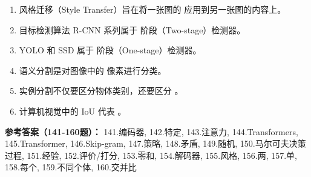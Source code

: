 \begin{enumerate}[resume,leftmargin=2em,itemsep=1pt]
\item 风格迁移（Style Transfer）旨在将一张图的 \underline{\hspace{3em}} 应用到另一张图的内容上。
\item 目标检测算法 R-CNN 系列属于 \underline{\hspace{3em}} 阶段（Two-stage）检测器。
\item YOLO 和 SSD 属于 \underline{\hspace{3em}} 阶段（One-stage）检测器。
\item 语义分割是对图像中的 \underline{\hspace{3em}} 像素进行分类。
\item 实例分割不仅要区分物体类别，还要区分 \underline{\hspace{3em}}。
\item 计算机视觉中的 IoU 代表 \underline{\hspace{3em}}。
\end{enumerate}

\textbf{参考答案（141-160题）：}
141.编码器, 142.特定, 143.注意力, 144.Transformers, 145.Transformer, 146.Skip-gram, 147.策略, 148.矛盾, 149.随机, 150.马尔可夫决策过程, 151.经验, 152.评价/打分, 153.零和, 154.解码器, 155.风格, 156.两, 157.单, 158.每个, 159.不同个体, 160.交并比

